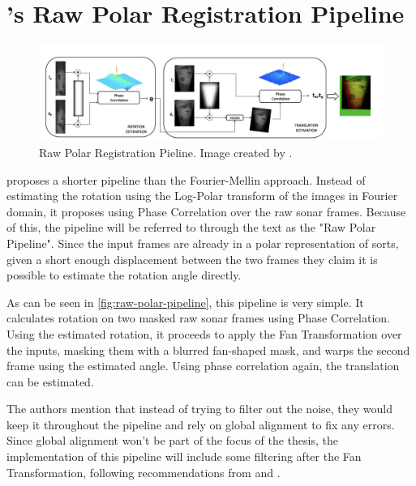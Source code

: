 \section{\citeauthor{Hurtos2015}'s Raw Polar Registration Pipeline}

\begin{figure}[H]
  \centering
  \includegraphics[width=\textwidth]{figures/RawPolarPipeline.png}
  \caption{Raw Polar Registration Pieline. Image created by \citeauthor{Hurtos2015}\cite{Hurtos2015}.}
  \label{fig:raw-polar-pipeline}
\end{figure}


\citeauthor{Hurtos2015} proposes a shorter pipeline than the Fourier-Mellin approach. Instead of estimating the rotation using the Log-Polar transform of the images in Fourier domain, it proposes using Phase Correlation over the raw sonar frames. Because of this, the pipeline will be referred to through the text as the "Raw Polar Pipeline". Since the input frames are already in a polar representation of sorts, given a short enough displacement between the two frames they claim it is possible to estimate the rotation angle directly.

As can be seen in \autoref{fig:raw-polar-pipeline}, this pipeline is very simple. It calculates rotation on two masked raw sonar frames using Phase Correlation. Using the estimated rotation, it proceeds to apply the Fan Transformation over the inputs, masking them with a blurred fan-shaped mask, and warps the second frame using the estimated angle. Using phase correlation again, the translation can be estimated.

The authors mention that instead of trying to filter out the noise, they would keep it throughout the pipeline and rely on global alignment to fix any errors. Since global alignment won't be part of the focus of the thesis, the implementation of this pipeline will include some filtering after the Fan Transformation, following recommendations from \citeauthor{5396234}\cite{5396234} and \citeauthor{Reddy1996}\cite{5396234}.